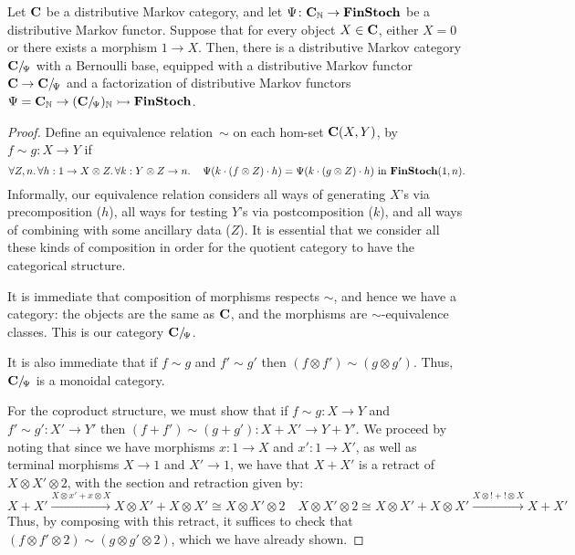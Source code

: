 \begin{proposition}\label{prop:quotient}
Let $\mathbf{C}$ be a distributive Markov category, and let $\Psi\colon
\mathbf{C}_{\mathbb{N}}\to \mathbf{FinStoch}$ be a distributive Markov functor.
Suppose that for every object $X\in\mathbf{C}$, either $X=0$ or there
exists a morphism $1\to X$. 
Then, there is a distributive Markov category $\mathbf{C}/\!_\Psi$ with a Bernoulli base, equipped with 
a distributive Markov functor $\mathbf{C}\to \mathbf{C}/\!_\Psi$ and a factorization of distributive Markov functors
$\Psi=\mathbf{C}_{\mathbb{N}}\to (\mathbf{C}/\!_\Psi)_{\mathbb{N}}\rightarrowtail \mathbf{FinStoch}$.
\end{proposition}
\begin{proof}
  Define an equivalence relation~$\sim$ on each hom-set $\mathbf{C}(X,Y)$,
  by $f\sim g:X\to Y$ if 
  \[
    \forall Z,n.\,\forall h:1\to X\otimes Z.\,\forall k:Y\otimes Z\to
    n.\,
    \quad
    \Psi(k\cdot (f\otimes Z)\cdot h)=
    \Psi(k\cdot (g\otimes Z)\cdot h)
    \text{ in }\mathbf{FinStoch}(1,n)\text.
  \]
  Informally, our equivalence relation considers all ways of generating $X$'s
  via precomposition ($h$),  all ways for testing $Y$'s via postcomposition ($k$), and all ways of combining with some ancillary data ($Z$).
  It is essential that we consider all these kinds of composition in order for the quotient category to have the categorical structure. 
  
  It is immediate that composition of morphisms respects $\sim$,
  and hence we have a category: the objects are the same as $\mathbf{C}$,
  and the morphisms are $\sim$-equivalence classes. This is our category $\mathbf{C}/\!_\Psi$.

  It is also immediate that if $f\sim g$ and $f'\sim
  g'$ then $(f\otimes f')\sim(g\otimes g')$. Thus, $\mathbf{C}/\!_\Psi$ is a
  monoidal category. 

  For the coproduct structure, we must show that if $f\sim g:X\to Y$ and
  $f'\sim g':X'\to Y'$ then $(f+f')\sim (g+g'):X+X'\to Y+Y'$.
  We proceed by noting that since we have morphisms
  $x:1\to X$ and $x':1\to X'$, as well as terminal morphisms $X\to 1$ and
  $X'\to 1$, we have that $X+X'$ is a retract of $X\otimes X'\otimes
  2$, with the section and retraction given by:
  \[
    X + X'\xrightarrow{X\otimes x'+x\otimes X} X\otimes X' + X\otimes
    X'\cong X\otimes X'\otimes 2
    \quad
     X\otimes X'\otimes 2\cong
    X\otimes X' + X\otimes X'
    \xrightarrow{X\otimes !+!\otimes X}
    X + X'
  \]
  Thus, by composing with this retract, it suffices to check that
  $(f\otimes f'\otimes 2)\sim (g\otimes g'\otimes 2)$,
  which we have already shown.


\end{proof}
